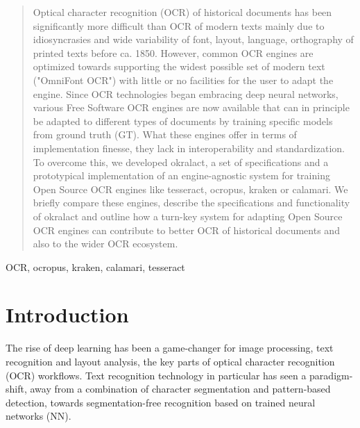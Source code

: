 \documentclass[conference]{IEEEtran}
\begin{document}
\begin{abstract}

Optical character recognition (OCR) of historical documents has been significantly more
difficult than OCR of modern texts mainly due to idiosyncrasies and wide
variability of font, layout, language, orthography of printed texts before ca.
1850. However, common OCR engines are optimized towards supporting the widest possible set
of modern text ("OmniFont OCR") with little or no facilities for the user to
adapt the engine. Since OCR technologies began embracing deep neural networks, various Free Software
OCR engines are now available that can in principle be adapted to different types of documents by training specific models from ground truth (GT). What these
engines offer in terms of implementation finesse, they lack in interoperability
and standardization. To overcome this, we developed okralact, a set of specifications
and a prototypical implementation of an engine-agnostic system for training
Open Source OCR engines like tesseract, ocropus, kraken or calamari. We briefly
compare these engines, describe the specifications and functionality of okralact 
and outline how a turn-key system for adapting Open Source OCR engines can contribute 
to better OCR of historical documents and also to the wider OCR ecosystem.

\end{abstract}

\begin{IEEEkeywords}
OCR, ocropus, kraken, calamari, tesseract
\end{IEEEkeywords}

\section*{Introduction}


The rise of deep learning has been a game-changer for image
processing, text recognition and layout analysis, the key parts of optical
character recognition (OCR) workflows. Text recognition technology in
particular has seen a paradigm-shift, away from a combination of character
segmentation and pattern-based detection, towards
segmentation-free recognition based on trained neural networks
(NN).
\end{document}
